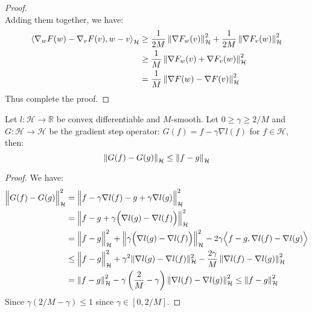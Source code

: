 \begin{proof}
\begin{equation*}
    \end{equation*}
    Adding them together, we have:
    \begin{equation*}
    \begin{aligned}
        \left\langle \nabla_w F(w) - \nabla_v F(v), w - v \right\rangle_\mathcal{H} &\ge \frac{1}{2M}\left\lVert\nabla F_w(v)\right\rVert^2_\mathcal{H} + \frac{1}{2M}\left\lVert \nabla F_v(w) \right\rVert^2_\mathcal{H} \\
        &\ge\frac{1}{M}\left\lVert\nabla F_w(v) + \nabla F_v(w)\right\rVert^2_\mathcal{H} \\
        &= \frac{1}{M}\left\lVert\nabla F(w) - \nabla F(v)\right\rVert^2_\mathcal{H} \\
    \end{aligned}
    \end{equation*}
    Thus complete the proof.
\end{proof}

\begin{lemma}
    \label{lem:stability-gd-2}
    Let $l : \mathcal{H} \rightarrow \mathbb{R} $ be convex differentiable and $M$-smooth. Let $0 \ge \gamma \ge 2/M$ and $G: \mathcal{H}\rightarrow \mathcal{H}$ be the gradient step operator: $G(f) = f - \gamma\nabla l(f)$ for $f\in\mathcal{H}$, then:
    \begin{equation*}
        \left\lVert G(f) - G(g)\right\rVert_\mathcal{H} \le \left\lVert f-g\right\rVert_\mathcal{H}
    \end{equation*}
\end{lemma}
\begin{proof}
    We have:
    \begin{equation*}
    \begin{aligned}
        \Big\| G(f) - G(g) \Big\|^2_\mathcal{H} &= \Big\| f - \gamma\nabla l(f) - g + \gamma\nabla l(g) \Big\|^2_\mathcal{H} \\
        &= \Big\| f - g + \gamma\Big( \nabla l(g) - \nabla l(f) \Big) \Big\|_\mathcal{H}^2 \\
        &= \Big\| f-g \Big\|^2_\mathcal{H} + \Big\| \gamma\Big( \nabla l(g) - \nabla l(f) \Big) \Big\|^2_\mathcal{H} - 2\gamma \Big\langle f - g, \nabla l(f) - \nabla l(g) \Big\rangle \\
        &\le \Big\| f-g \Big\|^2_\mathcal{H} + \gamma^2\| \nabla l(g) - \nabla l(f) \|^2_\mathcal{H} - \frac{2\gamma}{M}\left\lVert\nabla l(f) - \nabla l(g)\right\rVert^2_\mathcal{H} \\
        &= \left\lVert f-g\right\rVert^2_\mathcal{H}  - \gamma\left( \frac{2}{M} - \gamma \right)\left\lVert\nabla l(f) - \nabla l(g)\right\rVert^2_\mathcal{H} \le \left\lVert f-g\right\rVert^2_\mathcal{H}
    \end{aligned}
    \end{equation*}
    Since $\gamma(2/M - \gamma)\le1$ since $\gamma\in[0, 2/M]$.
\end{proof}

